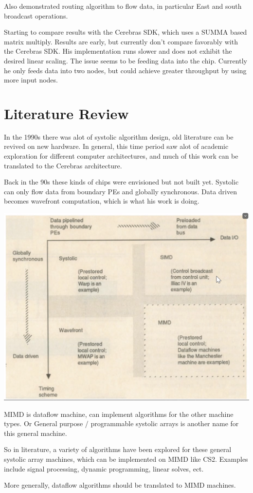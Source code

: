 \documentclass{article}
\begin{document}
Also demonstrated routing algorithm to flow data, in particular East and south broadcast operations.

Starting to compare results with the Cerebras SDK, which uses a SUMMA based matrix multiply.
Results are early, but currently don't compare favorably with the Cerebras SDK. 
His implementation runs slower and does not exhibit the desired linear scaling.
The issue seems to be feeding data into the chip. 
Currently he only feeds data into two nodes, but could achieve greater throughput by using more input nodes.

\section{Literature Review}
In the 1990s there was alot of systolic algorithm design, old literature can be revived on new hardware.
In general, this time period saw alot of academic exploration for different computer architectures, and much of this work can be translated to the Cerebras architecture.

Back in the 90s these kinds of chips were envisioned but not built yet.
Systolic can only flow data from boundary PEs and globally synchronous.
Data driven becomes wavefront computation, which is what his work is doing.

\begin{center}
  \includegraphics[width=0.5\linewidth]{machine_type.png}
\end{center}

MIMD is dataflow machine, can implement algorithms for the other machine types.
Or General purpose / programmable systolic arrays is another name for this general machine.

So in literature, a variety of algorithms have been explored for these general systolic array machines, 
which can be implemented on MIMD like CS2.
Examples include signal processing, dynamic programming, linear solves, ect.

More generally, dataflow algorithms should be translated to MIMD machines.
\end{document}
